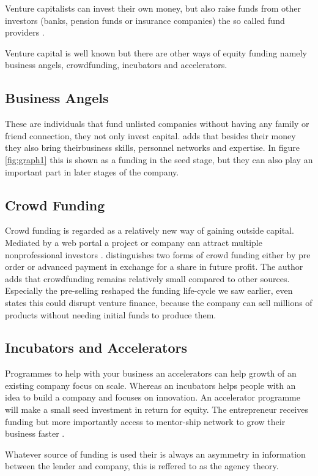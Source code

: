 \documentclass[a4paper, 11pt]{article}
\begin{document}
Venture capitalists can invest their own money, but also raise funds from other investors (banks, pension funds or insurance companies) the so called fund providers \citep{casson2008oxford}.

Venture capital is well known but there are other ways of equity funding namely business angels, crowdfunding, incubators and accelerators.

\subsection{Business Angels}
These are individuals that fund unlisted companies without having any family or friend connection, they not only invest capital. \cite{politis} adds that besides their money they also bring theirbusiness skills, personnel networks and expertise. In figure \ref{fig:graph1} this is shown as a funding in the seed stage, but they can also play an important part in later stages of the company.


\subsection{Crowd Funding}
Crowd funding is regarded as a relatively new way of gaining outside capital. Mediated by a web portal a project or company can attract multiple nonprofessional investors \citep{TiddBessant}. \cite{belleflamme} distinguishes two forms of crowd funding either by pre order or advanced payment in exchange for a share in future profit. The author adds that crowdfunding  remains relatively small compared to other sources. Especially the pre-selling reshaped the funding life-cycle we saw earlier, \cite{bella} even states this could disrupt venture finance, because the company can sell millions of products without needing initial funds to produce them.

\subsection{Incubators and Accelerators}
Programmes to help with your business an accelerators can help growth of an existing company focus on scale. Whereas an incubators helps people with an idea to build a company and focuses on innovation. An accelerator programme will make a small seed investment in return for equity. The entrepreneur receives funding but more importantly access to mentor-ship network to grow their business faster \citep{forrest}.

Whatever source of funding is used their is always an asymmetry in information between the lender and company, this is reffered to as the agency theory.
\end{document}
